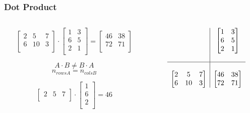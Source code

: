 \documentclass[10pt]{beamer}
\begin{document}
\begin{frame}[fragile]
  \frametitle{Dot Product}
  \begin{columns}
  \begin{column}{0.45\textwidth}
  \[
    \begin{bmatrix}
      2 & 5  & 7 \\
      6 & 10 & 3 \\
    \end{bmatrix}
    \cdot
    \begin{bmatrix}
    1 & 3 \\
    6 & 5 \\
    2 & 1 \\
    \end{bmatrix}
    =
    \begin{bmatrix}
      46 & 38 \\
      72 & 71 \\
  \end{bmatrix} \]

  \begin{shaded}
  \[ A\cdot B \neq B\cdot A \]
  \[ n_{rowsA} = n_{colsB}\]

  \end{shaded}

  \[
    \begin{bmatrix}
      2 & 5 & 7 \\
    \end{bmatrix}
    \cdot
    \begin{bmatrix}
      1 \\ 6 \\ 2 \\
    \end{bmatrix}
    = 46 \]

  \end{column}

  \begin{column}{0.45\textwidth}

  \[ \begin{array}{c|c}
        & \begin{bmatrix}
         1 & 3 \\
         6 & 5 \\
         2 & 1 \\
         \end{bmatrix} \\
          & \\
         \hline
          & \\
    \begin{bmatrix}
      2 & 5  & 7 \\
      6 & 10 & 3 \\
    \end{bmatrix} &
    \begin{bmatrix}
      46 & 38 \\
      72 & 71 \\
    \end{bmatrix}
    \\
    \end{array}
  \]
  \begin{snugshade}
  \begin{verbatim}


\end{verbatim}
\end{snugshade}
\end{column}
\end{columns}
\end{frame}
\end{document}
